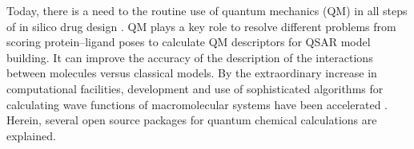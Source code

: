 Today, there is a need to the routine use of quantum mechanics (QM) in all steps of in silico drug design \cite{Vivo_2011}. QM plays a key role to resolve different problems from scoring protein–ligand poses to calculate QM descriptors for QSAR model building. It can improve the accuracy of the description of the interactions between molecules versus classical models. By the extraordinary increase in computational facilities, development and use of sophisticated algorithms for calculating wave functions of macromolecular systems have been accelerated \cite{Merz_2010}. Herein, several open source packages for quantum chemical calculations are explained.	 